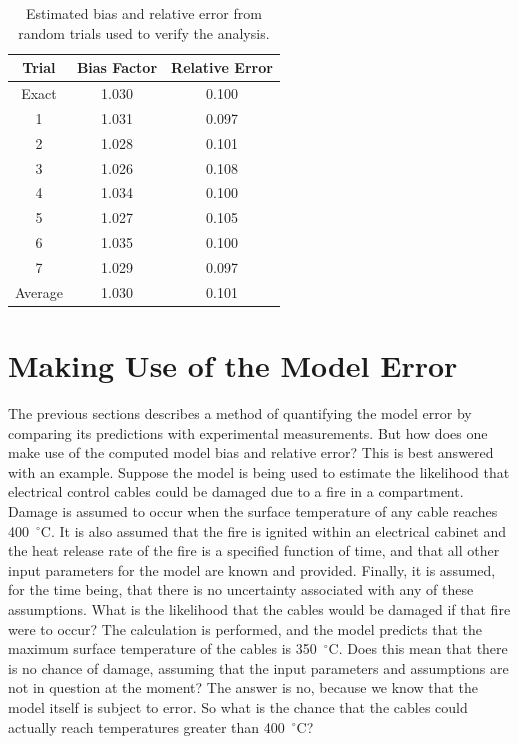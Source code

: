 \begin{table}[t]
\caption{Estimated bias and relative error from random trials used to verify the analysis. }
\begin{center}
\begin{tabular}{|c|c|c|}
\hline
Trial   & Bias Factor      & Relative Error \\ \hline \hline
Exact   & 1.030            &    0.100            \\ \hline \hline
1       & 1.031            &    0.097            \\ \hline
2       & 1.028            &    0.101            \\ \hline
3       & 1.026            &    0.108            \\ \hline
4       & 1.034            &    0.100            \\ \hline
5       & 1.027            &    0.105            \\ \hline
6       & 1.035            &    0.100            \\ \hline
7       & 1.029            &    0.097            \\ \hline \hline
Average & 1.030            &    0.101            \\ \hline
\end{tabular}
\end{center}
\label{trials}
\end{table}





\section{Making Use of the Model Error}

The previous sections describes a method of quantifying the model error by comparing its predictions with experimental measurements. But how does one make use of the computed
model bias and relative error? This is best answered with an example. Suppose the model is being used to estimate the likelihood that
electrical control cables could be damaged due to
a fire in a compartment. Damage is assumed to occur when the surface temperature of any cable reaches 400~$^\circ$C. It is also assumed that the fire is
ignited within an electrical cabinet and the heat release rate of the fire is a specified function of time, and that all other input
parameters for the model are known and provided. Finally, it is assumed, for the time being, that there is no uncertainty
associated with any of these assumptions. What is the likelihood that the cables would be damaged if that fire were to occur? The calculation is performed, and the
model predicts that the maximum surface temperature of the cables is 350~$^\circ$C. Does this mean that there is no chance of damage, assuming that the input parameters
and assumptions are not in question at the moment? The answer is no, because we know that the model itself is subject to error. So what is the chance that the
cables could actually reach temperatures greater than 400~$^\circ$C?

